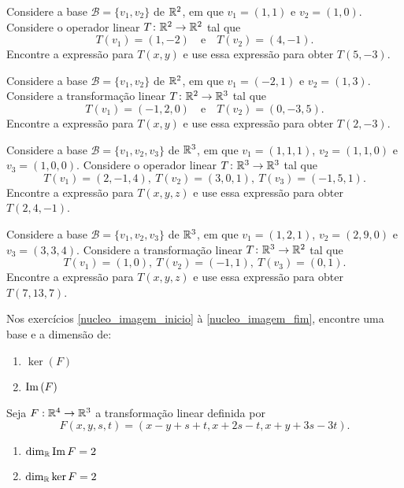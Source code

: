 \documentclass[12pt]{exam}
\begin{document}
\begin{exercicio}
  Considere a base $\mathcal{B} = \{v_1, v_2\}$ de $\mathbb{R}^2$, em que $v_1 = (1, 1)$ e $v_2 = (1, 0)$. Considere o operador linear $T \colon \mathbb{R}^2 \to \mathbb{R}^2$ tal que
  \[
    T(v_1) = (1, -2)\quad \mbox{e} \quad T(v_2) = (4, -1).
  \]
  Encontre a expressão para $T(x, y)$ e use essa expressão para obter $T(5, -3)$.
\end{exercicio}

\begin{exercicio}
  Considere a base $\mathcal{B} = \{v_1, v_2\}$ de $\mathbb{R}^2$, em que $v_1 = (-2, 1)$ e $v_2 = (1, 3)$. Considere a transformação linear $T \colon \mathbb{R}^2 \to \mathbb{R}^3$ tal que
  \[
    T(v_1) = (-1, 2, 0)\quad \mbox{e} \quad T(v_2) = (0, -3, 5).
  \]
  Encontre a expressão para $T(x, y)$ e use essa expressão para obter $T(2, -3)$.
\end{exercicio}

\begin{exercicio}
  Considere a base $\mathcal{B} = \{v_1, v_2, v_3\}$ de $\mathbb{R}^3$, em que $v_1 = (1, 1, 1)$, $v_2 = (1, 1, 0)$ e $v_3 = (1, 0, 0)$. Considere o operador linear $T \colon \mathbb{R}^3 \to \mathbb{R}^3$ tal que
  \[
    T(v_1) = (2, -1, 4),\ T(v_2) = (3, 0, 1),\ T(v_3) = (-1, 5, 1).
  \]
  Encontre a expressão para $T(x, y, z)$ e use essa expressão para obter $T(2, 4, -1)$.
\end{exercicio}

\begin{exercicio}
  Considere a base $\mathcal{B} = \{v_1, v_2, v_3\}$ de $\mathbb{R}^3$, em que $v_1 = (1, 2, 1)$, $v_2 = (2, 9, 0)$ e $v_3 = (3, 3, 4)$. Considere a transformação linear $T \colon \mathbb{R}^3 \to \mathbb{R}^2$ tal que
  \[
    T(v_1) = (1, 0),\ T(v_2) = (-1, 1),\ T(v_3) = (0, 1).
  \]
  Encontre a expressão para $T(x, y, z)$ e use essa expressão para obter $T(7, 13, 7)$.
\end{exercicio}

Nos exercícios \eqref{nucleo_imagem_inicio} à \eqref{nucleo_imagem_fim}, encontre uma base e a dimensão de:
\begin{enumerate}[label={\alph*})]
  \item $\ker(F)$

  \item ${\rm Im\,}(F)$
\end{enumerate}

\begin{exercicio}\label{nucleo_imagem_inicio}
  Seja $F : \mathbb{R}^4 \to \mathbb{R}^3$ a transformação linear definida por
  \[
  F(x,y,s,t) = (x - y + s + t, x + 2s - t, x + y + 3s - 3t).
  \]
  \begin{solucao}
    \begin{enumerate}[label={\alph*})]
      \item $\dim_{\mathbb{R}}{\rm Im\,} F = 2$

      \item $\dim_{\mathbb{R}}\ker F = 2$
    \end{enumerate}
  \end{solucao}
\end{exercicio}
\end{document}

